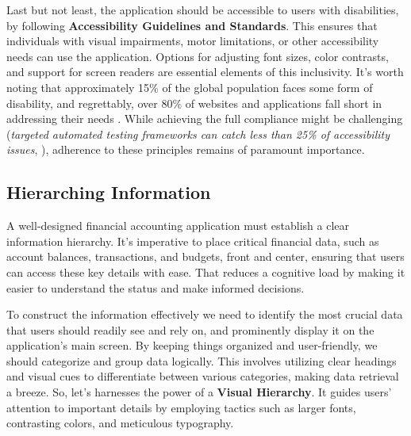 Last but not least, the application should be accessible to users with disabilities, by following \textbf{Accessibility 
Guidelines and Standards}. This ensures that individuals with visual impairments, motor limitations, or other 
accessibility needs can use the application. Options for adjusting font sizes, color contrasts, and support for 
screen readers are essential elements of this inclusivity. It's worth noting that approximately 15\% of the global 
population faces some form of disability, and regrettably, over 80\% of websites and applications fall short in 
addressing their needs \cite{Worl11}. While achieving the full compliance might be challenging (\emph{targeted 
automated testing frameworks can catch less than 25\% of accessibility issues}, \cite{Univ22}), adherence to these 
principles remains of paramount importance.


\subsection{Hierarching Information}

A well-designed financial accounting application must establish a clear information hierarchy. It's imperative to place 
critical financial data, such as account balances, transactions, and budgets, front and center, ensuring that users can 
access these key details with ease. That reduces a cognitive load by making it easier to understand the status and make 
informed decisions.

To construct the information effectively we need to identify the most crucial data that users should readily see and 
rely on, and prominently display it on the application's main screen. By keeping things organized and user-friendly, 
we should categorize and group data logically. This involves utilizing clear headings and visual cues to differentiate 
between various categories, making data retrieval a breeze. So, let's harnesses the power of a \textbf{Visual Hierarchy}. 
It guides users' attention to important details by employing tactics such as larger fonts, contrasting colors, and 
meticulous typography. 


